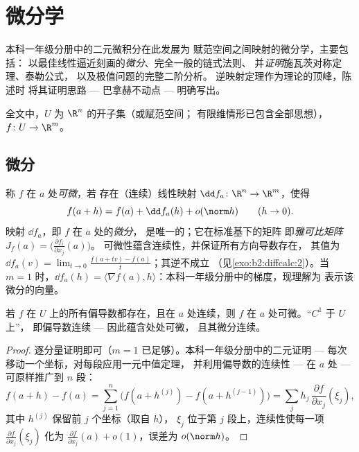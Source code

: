 \chapter{微分学}\label{ch:b2:diffcalc}

本科一年级分册中的二元微积分在此发展为
赋范空间之间映射的微分学，主要包括：
以最佳线性逼近刻画的\emph{微分}、完全一般的链式法则、
并\emph{证明}施瓦茨对称定理、泰勒公式，
以及极值问题的完整二阶分析。
逆映射定理作为理论的顶峰，陈述时
将其证明思路 --- 巴拿赫不动点 --- 明确写出。

全文中，$U$ 为 $\R^n$ 的开子集（或赋范空间；
有限维情形已包含全部思想），$f \colon U \to
\R^m$。

\section{微分}

\begin{definition}\label{def:b2:diffcalc:differential}
称 $f$ 在 $a$ 处\emph{可微}，若
存在（连续）线性映射 $\dd f_a \colon \R^n \to \R^m$，使得
\[
f(a + h) = f(a) + \dd f_a(h) + o(\norm h)
\qquad (h \to 0).
\]
映射 $\dd f_a$，即 $f$ 在 $a$ 处的\emph{微分}，
是唯一的；它在标准基下的矩阵
即\emph{雅可比矩阵} $J_f(a) =
\bigl(\frac{\partial f_i}{\partial x_j}(a)\bigr)$。
可微性蕴含连续性，并保证所有方向导数存在，
其值为 $\dd f_a(v) = \lim_{t\to0}\frac{f(a + tv)
- f(a)}{t}$；其逆不成立
（见\cref{exo:b2:diffcalc:2}）。当 $m = 1$ 时，$\dd f_a(h) = \langle
\nabla f(a), h\rangle$：本科一年级分册中的梯度，现理解为
表示该微分的向量。
\end{definition}

\begin{theorem}[$C^1$ 判别法]\label{thm:b2:diffcalc:c1}
若 $f$ 在 $U$ 上的所有偏导数都存在，且在
$a$ 处连续，则 $f$ 在 $a$ 处可微。“$C^1$ 于 $U$ 上”，
即偏导数连续 --- 因此蕴含处处可微，
且其微分连续。
\end{theorem}

\begin{proof}
逐分量证明即可（$m = 1$ 已足够）。本科一年级分册中的二元证明 ---
每次移动一个坐标，对每段应用一元中值定理，
并利用偏导数的连续性 ---
在 $a$ 处 --- 可原样推广到 $n$ 段：
\[
f(a + h) - f(a) = \sum_{j=1}^{n} \bigl(f(a + h^{(j)}) - f(a +
h^{(j-1)})\bigr)
= \sum_j h_j\,\frac{\partial f}{\partial x_j}(\xi_j),
\]
其中 $h^{(j)}$ 保留前 $j$ 个坐标（取自 $h$），
$\xi_j$ 位于第 $j$ 段上，连续性使每一项
$\frac{\partial f}{\partial x_j}(\xi_j)$ 化为 $\frac{\partial
f}{\partial x_j}(a) + o(1)$，误差为 $o(\norm h)$。
\end{proof}

